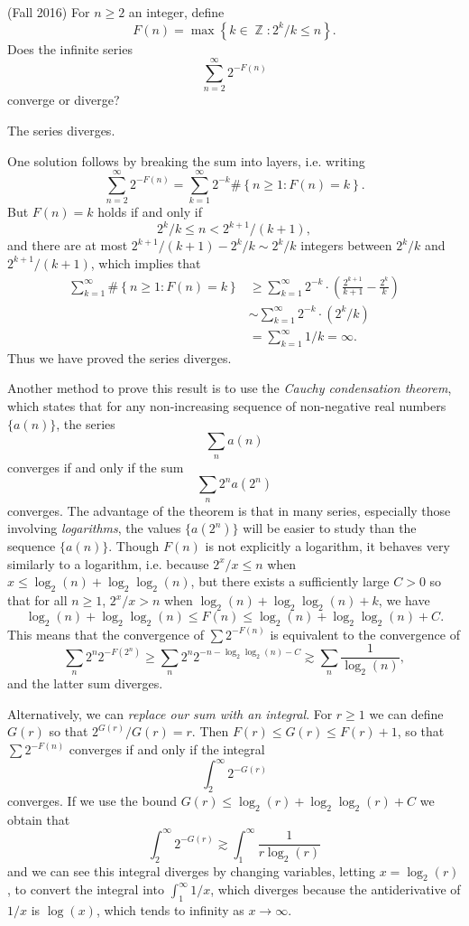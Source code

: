 \documentclass[answers]{exam}
\DeclareMathOperator{\ZZ}{\mathbb{Z}}
\begin{document}
\begin{questions}

\question (Fall 2016)
  For $n \geq 2$ an integer, define
  \[ F(n)= \max \left\{ k\in \ZZ: 2^k/k\leq n \right\}. \]
  Does the infinite series
  \[ \sum_{n=2}^{\infty}2^{-F(n)} \]
  converge or diverge?
\begin{solution}
	The series diverges.

	One solution follows by breaking the sum into layers, i.e. writing
	\[ \sum_{n = 2}^\infty 2^{-F(n)} = \sum_{k = 1}^\infty 2^{-k} \# \left\{ n \geq 1 : F(n) = k \right\}. \]
	But $F(n) = k$ holds if and only if
	\[ 2^k/k \leq n < 2^{k+1} / (k+1), \]
	and there are at most $2^{k+1} / (k+1) - 2^k / k \sim 2^k / k$ integers between $2^k / k$ and $2^{k+1} / (k+1)$, which implies that
	\begin{align*}
		\sum_{k = 1}^\infty \# \left\{ n \geq 1: F(n) = k \right\} &\geq \sum_{k=1}^{\infty} 2^{-k} \cdot \left( \frac{2^{k+1}}{k+1}-\frac{2^{k}}{k} \right)\\
    &\sim \sum_{k=1}^{\infty} 2^{-k} \cdot (2^k / k)\\
    &=\sum_{k=1}^{\infty} 1/k = \infty.
  \end{align*}
  Thus we have proved the series diverges.

  Another method to prove this result is to use the \emph{Cauchy condensation theorem}, which states that for any non-increasing sequence of non-negative real numbers $\{ a(n) \}$, the series
	\[ \sum_n a(n) \]
	converges if and only if the sum
	\[ \sum_n 2^n a(2^n) \]
	converges. The advantage of the theorem is that in many series, especially those involving \emph{logarithms}, the values $\{ a(2^n) \}$ will be easier to study than the sequence $\{ a(n) \}$. Though $F(n)$ is not explicitly a logarithm, it behaves very similarly to a logarithm, i.e. because $2^x / x \leq n$ when $x \leq \log_2(n) + \log_2 \log_2(n)$, but there exists a sufficiently large $C > 0$ so that for all $n \geq 1$, $2^x / x > n$ when $\log_2(n) + \log_2 \log_2(n) + k$, we have
	\[ \log_2(n) + \log_2 \log_2(n) \leq F(n) \leq \log_2(n) + \log_2 \log_2(n) + C. \]
	This means that the convergence of $\sum 2^{-F(n)}$ is equivalent to the convergence of
	\[ \sum_n 2^n 2^{-F(2^n)} \geq \sum_n 2^n 2^{- n - \log_2 \log_2(n) - C } \gtrsim \sum_n \frac{1}{\log_2(n)}, \]
	and the latter sum diverges.

	Alternatively, we can \emph{replace our sum with an integral}. For $r \geq 1$ we can define $G(r)$ so that $2^{G(r)} / G(r) = r$. Then $F(r) \leq G(r) \leq F(r) + 1$, so that $\sum 2^{-F(n)}$ converges if and only if the integral
	\[ \int_2^\infty 2^{-G(r)} \]
	converges. If we use the bound $G(r) \leq \log_2(r) + \log_2 \log_2(r) + C$ we obtain that
	\[ \int_2^\infty 2^{-G(r)} \gtrsim \int_1^\infty \frac{1}{r \log_2(r)} \]
	and we can see this integral diverges by changing variables, letting $x = \log_2(r)$, to convert the integral into $\int_1^\infty 1/x$, which diverges because the antiderivative of $1/x$ is $\log(x)$, which tends to infinity as $x \to \infty$.
\end{solution}


\end{questions}
\end{document}
